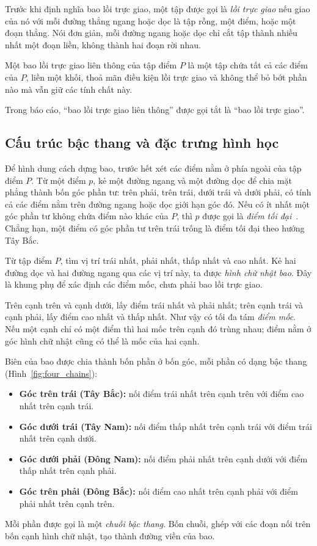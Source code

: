 Trước khi định nghĩa bao lồi trực giao, một tập được gọi là \emph{lồi trực giao} nếu giao của nó với mỗi đường thẳng ngang hoặc dọc là tập rỗng, một điểm, hoặc một đoạn thẳng. Nói đơn giản, mỗi đường ngang hoặc dọc chỉ cắt tập thành nhiều nhất một đoạn liền, không thành hai đoạn rời nhau.

\begin{dinhnghia}
Một bao lồi trực giao liên thông của tập điểm $P$ là một tập chứa tất cả các điểm của $P$, liền một khối, thoả mãn điều kiện lồi trực giao và không thể bỏ bớt phần nào mà vẫn giữ các tính chất này.
\end{dinhnghia}
Trong báo cáo, ``bao lồi trực giao liên thông'' được gọi tắt là ``bao lồi trực giao''.

\subsection{Cấu trúc bậc thang và đặc trưng hình học}
\label{sec:staircase}

Để hình dung cách dựng bao, trước hết xét các điểm nằm ở phía ngoài của tập điểm $P$. Từ một điểm $p$, kẻ một đường ngang và một đường dọc để chia mặt phẳng thành bốn góc phần tư: trên phải, trên trái, dưới trái và dưới phải, có tính cả các điểm nằm trên đường ngang hoặc dọc giới hạn góc đó. Nếu có ít nhất một góc phần tư không chứa điểm nào khác của $P$, thì $p$ được gọi là \emph{điểm tối đại}~\cite{nguyen2022quickhull}. Chẳng hạn, một điểm có góc phần tư trên trái trống là điểm tối đại theo hướng Tây Bắc.

Từ tập điểm $P$, tìm vị trí trái nhất, phải nhất, thấp nhất và cao nhất. Kẻ hai đường dọc và hai đường ngang qua các vị trí này, ta được \emph{hình chữ nhật bao}. Đây là khung phụ để xác định các điểm mốc, chưa phải bao lồi trực giao.

Trên cạnh trên và cạnh dưới, lấy điểm trái nhất và phải nhất; trên cạnh trái và cạnh phải, lấy điểm cao nhất và thấp nhất. Như vậy có tối đa tám \emph{điểm mốc}. Nếu một cạnh chỉ có một điểm thì hai mốc trên cạnh đó trùng nhau; điểm nằm ở góc hình chữ nhật cũng có thể là mốc của hai cạnh.

Biên của bao được chia thành bốn phần ở bốn góc, mỗi phần có dạng bậc thang (Hình~\ref{fig:four_chains}):
\begin{itemize}
  \item \textbf{Góc trên trái (Tây Bắc):} nối điểm trái nhất trên cạnh trên với điểm cao nhất trên cạnh trái.
  \item \textbf{Góc dưới trái (Tây Nam):} nối điểm thấp nhất trên cạnh trái với điểm trái nhất trên cạnh dưới.
  \item \textbf{Góc dưới phải (Đông Nam):} nối điểm phải nhất trên cạnh dưới với điểm thấp nhất trên cạnh phải.
  \item \textbf{Góc trên phải (Đông Bắc):} nối điểm cao nhất trên cạnh phải với điểm phải nhất trên cạnh trên.
\end{itemize}
Mỗi phần được gọi là một \emph{chuỗi bậc thang}. Bốn chuỗi, ghép với các đoạn nối trên bốn cạnh hình chữ nhật, tạo thành đường viền của bao.

